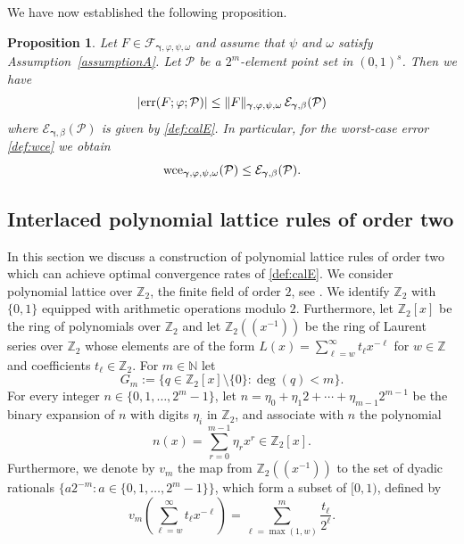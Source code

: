 \documentclass[namedate,webpdf,imanum]{ima-authoring-arxiv}%
\theoremstyle{thmstyletwo}%
\newtheorem{proposition}{Proposition}%
\numberwithin{equation}{section}
\newcommand{\bsgamma}{\boldsymbol{\gamma}}
\newcommand{\NN}{\mathbb{N}}
\newcommand{\cP}{\mathcal{P}}
\begin{document}
We have now established the following proposition.
\begin{proposition}\label{prob:errbd}
Let $F \in\mathcal{F}_{\bsgamma,\varphi,\psi,\omega}$ and assume that $\psi$ and $\omega$ satisfy Assumption~\ref{assumptionA}. Let $\cP$ be a $2^m$-element point set in $(0,1)^s$. Then we have $$|{\rm err}(F;\varphi;\cP)| \le \|F\|_{\bsgamma,\varphi,\psi,\omega} \, \mathcal{E}_{\bsgamma,\beta}(\cP)$$ where $\mathcal{E}_{\bsgamma,\beta}(\cP)$ is given by \eqref{def:calE}. In particular, for the worst-case error \eqref{def:wce} we obtain $${\rm wce}_{\bsgamma,\varphi,\psi,\omega}(\cP) \le \mathcal{E}_{\bsgamma,\beta}(\cP).$$
\end{proposition}

\subsection{Interlaced polynomial lattice rules of order two}

In this section we discuss a construction of polynomial lattice rules of order two which can achieve optimal convergence rates of \eqref{def:calE}. We consider polynomial lattice over $\mathbb{Z}_2$, the finite field of order $2$, see \cite{niesiam}. We identify $\mathbb{Z}_2$ with $\{0,1\}$ equipped with arithmetic operations modulo $2$. Furthermore, let $\mathbb{Z}_2[x]$ be the ring of polynomials over $\mathbb{Z}_2$ and let $\mathbb{Z}_2((x^{-1}))$ be the ring of Laurent series over $\mathbb{Z}_2$ whose elements are of the form $L(x)=\sum_{\ell=w}^{\infty} t_{\ell} x^{-\ell}$ for $w \in \mathbb{Z}$ and coefficients $t_{\ell}\in \mathbb{Z}_2$. For $m \in \NN$ let
\begin{equation*}
G_m := \{ q \in \mathbb{Z}_2[x] \setminus \{ 0 \} : \deg(q) < m \}. 
\end{equation*}
For every integer $n \in \{0,1,\ldots,2^m-1\}$, let $n = \eta_0 + \eta_1 2 + \cdots + \eta_{m-1} 2^{m-1}$ be the binary expansion of $n$ with digits $\eta_i$ in $\mathbb{Z}_2$, and associate with $n$ the polynomial
\begin{equation*}
n(x) = \sum_{r=0}^{m-1} \eta_r x^r \in \mathbb{Z}_2[x].
\end{equation*}
Furthermore, we denote by $v_m$ the map from $\mathbb{Z}_2((x^{-1}))$ to the set of dyadic rationals $\{a 2^{-m} : a \in \{0,1,\ldots,2^m-1\}\}$, which form a subset of $[0,1)$, defined by
\begin{equation*}
v_m\left( \sum_{\ell=w}^{\infty} t_{\ell} x^{-\ell} \right) = \sum_{\ell=\max(1,w)}^{m} \frac{t_{\ell}}{2^{\ell}}.
\end{equation*}
\end{document}
